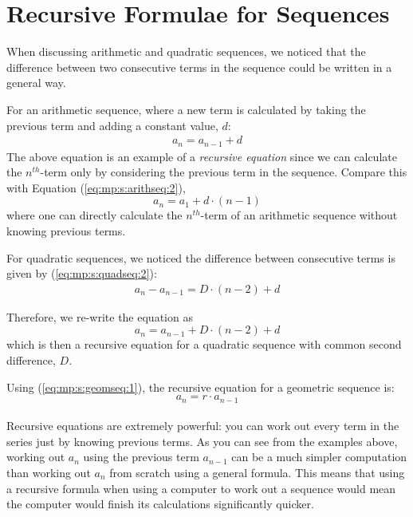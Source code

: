 \section{Recursive Formulae for Sequences}

When discussing arithmetic and quadratic sequences, we noticed that the difference between two
consecutive terms in the sequence could be written in a general way. 

For an arithmetic sequence, where a new term is calculated by taking the previous term and adding a
constant value, $d$:
\begin{eqnarray*}
a_n = a_{n-1} + d
\end{eqnarray*}
The above equation is an example of a \textit{recursive equation} since we can calculate the
$n^{th}$-term only by considering the previous term in the sequence. Compare this with Equation
(\ref{eq:mp:s:arithseq:2}),
\begin{equation}
a_n = a_1 + d \cdot (n - 1)
\end{equation}
where one can directly calculate the $n^{th}$-term of an arithmetic sequence without knowing
previous terms. 

For quadratic sequences, we noticed the difference between consecutive terms is given by
(\ref{eq:mp:s:quadseq:2}):
\begin{eqnarray*}
a_n - a_{n-1} = D \cdot (n-2) + d
\end{eqnarray*}

Therefore, we re-write the equation as
\begin{equation}
a_n = a_{n-1} + D \cdot (n-2) + d
\end{equation}
which is then a recursive equation for a quadratic sequence with common second difference, $D$. 

Using (\ref{eq:mp:s:geomseq:1}), the recursive equation for a geometric sequence is:
\begin{equation}
a_n = r \cdot a_{n-1}
\end{equation}
\\
Recursive equations are extremely powerful: you can work out every term in the series just by
knowing previous terms. As you can see from the examples above, working out $a_n$ using the previous
term $a_{n-1}$ can be a much simpler computation than working out $a_n$ from scratch using a general
formula. This means that using a recursive formula when using a computer to work out a sequence
would mean the computer would finish its calculations significantly quicker.

